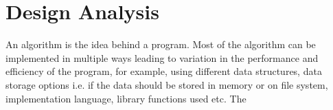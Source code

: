 \chapter{Design Analysis}
An algorithm is the idea behind a program. Most of the algorithm can be implemented in multiple ways leading to variation in the performance and efficiency of the program, for example, using different data structures, data storage options i.e. if the data should be stored in memory or on file system, implementation language, library functions used etc. The  
